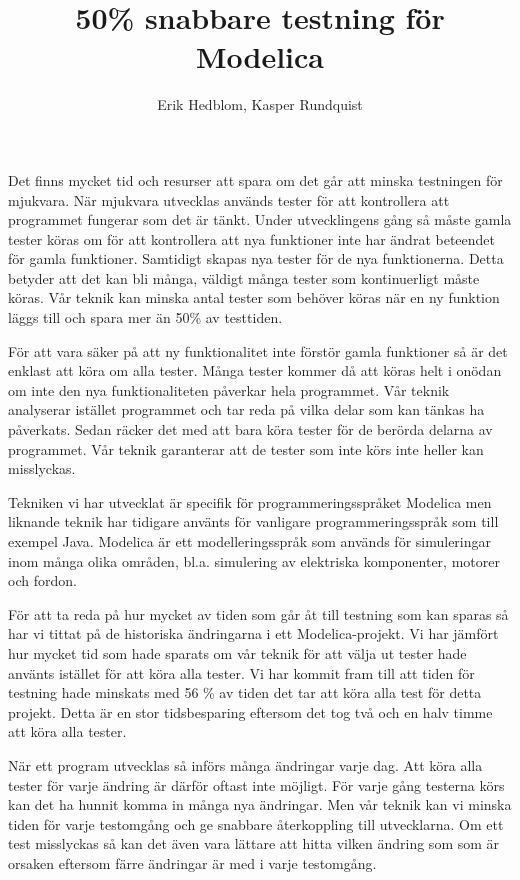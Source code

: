 \documentclass{popsci}
\author{Erik Hedblom, Kasper Rundquist}
\title{50\% snabbare testning för Modelica}
\begin{document}


{\noindent Det finns mycket tid och resurser att spara om det går att minska testningen för mjukvara. När mjukvara utvecklas används tester för att kontrollera att programmet fungerar som det är tänkt. Under utvecklingens gång så måste gamla tester köras om för att kontrollera att nya funktioner inte har ändrat beteendet för gamla funktioner. Samtidigt skapas nya tester för de nya funktionerna. Detta betyder att det kan bli många, väldigt många tester som kontinuerligt måste köras. Vår teknik kan minska antal tester som behöver köras när en ny funktion läggs till och spara mer än 50\% av testtiden. 

För att vara säker på att ny funktionalitet inte förstör gamla funktioner så är det enklast att köra om alla tester. %
Många tester kommer då att köras helt i onödan om inte den nya funktionaliteten påverkar hela programmet. Vår teknik analyserar istället programmet och tar reda på vilka delar som kan tänkas ha påverkats. Sedan räcker det med att bara köra tester för de berörda delarna av programmet. Vår teknik garanterar att de tester som inte körs inte heller kan misslyckas.

Tekniken vi har utvecklat är specifik för programmeringsspråket Modelica men liknande teknik har tidigare använts för vanligare programmeringsspråk som till exempel Java. Modelica är ett modelleringsspråk som används för simuleringar inom många olika områden, bl.a. simulering av elektriska komponenter, motorer och fordon. 

För att ta reda på hur mycket av tiden som går åt till testning som kan sparas så har vi tittat på de historiska ändringarna i ett Modelica-projekt. Vi har jämfört hur mycket tid som hade sparats om vår teknik för att välja ut tester hade använts istället för att köra alla tester. Vi har kommit fram till att tiden för testning hade minskats med 56 \% av tiden det tar att köra alla test för detta projekt. Detta är en stor tidsbesparing eftersom det tog två och en halv timme att köra alla tester.

När ett program utvecklas så införs många ändringar varje dag. Att köra alla tester för varje ändring är därför oftast inte möjligt. För varje gång testerna körs kan det ha hunnit komma in många nya ändringar. Men vår teknik kan vi minska tiden för varje testomgång och ge snabbare återkoppling till utvecklarna. Om ett test misslyckas så kan det även vara lättare att hitta vilken ändring som som är orsaken eftersom färre ändringar är med i varje testomgång. 
}
\end{document}
